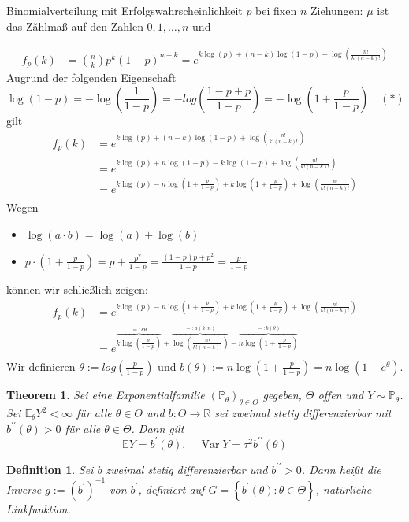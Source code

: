\documentclass[a4paper,oneside,bibliography=totoc]{scrartcl}
\newtheorem{defn}{Definition}[section] %
\newtheorem{Satz}{Theorem}[section]
\begin{document}
 Binomialverteilung mit Erfolgswahrscheinlichkeit $p$ bei fixen $n$ Ziehungen: $\mu$ ist das Zăhlmaß auf den Zahlen $0,1, \ldots, n$ und

\begin{align*}
    f_p(k) &={n \choose k} p^k(1-p)^{n-k} = e^{k\log(p)+(n-k)\log(1-p)+\log(\frac{n!}{k!(n-k)!})}
\end{align*}
Augrund der folgenden Eigenschaft
$$
\log(1-p)=-\log(\frac{1}{1-p})=-log(\frac{1-p+p}{1-p})=-\log(1+\frac{p}{1-p}) \quad (*)
$$
gilt 
\begin{align*}
    f_p(k) &= e^{k\log(p)+(n-k)\log(1-p)+\log(\frac{n!}{k!(n-k)!})}\\
    &=e^{k\log(p)+n\log(1-p)-k\log(1-p)+\log(\frac{n!}{k!(n-k)!})}\\
    &=e^{k\log(p)-n\log(1+\frac{p}{1-p})+k\log(1+\frac{p}{1-p})+\log(\frac{n!}{k!(n-k)!})}\\
\end{align*}
Wegen 
\begin{itemize}
    \item {} $\log(a\cdot b)=\log(a)+\log(b)$
    \item $p\cdot(1+\frac{p}{1-p})=p+\frac{p^{2}}{1-p}=\frac{(1-p)p+p^{2}}{1-p}=\frac{p}{1-p}$
\end{itemize}
können wir schließlich zeigen:
\begin{align*}
    f_p(k) &= e^{k\log(p)-n\log(1+\frac{p}{1-p})+k\log(1+\frac{p}{1-p})+\log(\frac{n!}{k!(n-k)!})}\\
    &=e^{\overbrace{k\log(\frac{p}{1-p})}^{=:k\theta}+\overbrace{\log(\frac{n!}{k!(n-k)!})}^{=:a(k,n)}-\overbrace{n\log(1+\frac{p}{1-p})}^{=:b(\theta)}}\\
\end{align*}
Wir definieren $\theta:=log(\frac{p}{1-p})$ und 
$b(\theta):=n\log(1+\frac{p}{1-p})=n\log(1+e^{\theta})$.

\begin{Satz}
    Sei eine Exponentialfamilie $\left(\mathbb{P}_\theta\right)_{\theta \in \Theta}$ gegeben, $\Theta$ offen und $Y \sim \mathbb{P}_\theta$. Sei $\mathbb{E}_\theta Y^2<\infty$ für alle $\theta \in \Theta$ und $b: \Theta \rightarrow \mathbb{R}$ sei zweimal stetig differenzierbar mit $b^{\prime \prime}(\theta)>0$ für alle $\theta \in \Theta$. Dann gilt
$$
\mathbb{E} Y=b^{\prime}(\theta), \quad \operatorname{Var} Y=\tau^2 b^{\prime \prime}(\theta)
$$
\end{Satz}

\begin{defn}
     Sei $b$ zweimal stetig differenzierbar und $b^{\prime \prime}>0$. Dann heißt die Inverse $g:=\left(b^{\prime}\right)^{-1}$ von $b^{\prime}$, definiert auf $G=\left\{b^{\prime}(\theta): \theta \in \Theta\right\}$, natürliche Linkfunktion.
\end{defn}
\end{document}
